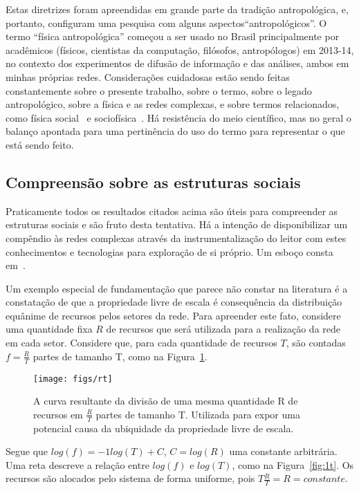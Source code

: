 \documentclass[a4paper,openright,12pt]{report} %
\begin{document}
Estas diretrizes foram apreendidas em grande parte da tradição antropológica,
e, portanto, configuram uma pesquisa com alguns aspectos``antropológicos''.
O termo ``física antropológica'' começou a ser usado no Brasil principalmente por
acadêmicos (físicos, cientistas da computação, filósofos, antropólogos) em 2013-14,
no contexto dos experimentos de difusão de informação e das análises, ambos em minhas próprias redes.
Considerações cuidadosas estão sendo feitas constantemente sobre o presente trabalho, 
sobre o termo, sobre o legado antropológico,
sobre a física e as redes complexas, e sobre termos relacionados, 
como física social~\cite{pentland} e sociofísica~\cite{socioF}.
Há resistência do meio científico, mas no geral o balanço apontada para uma pertinência do uso do termo
para representar o que está sendo feito.

\subsection{Compreensão sobre as estruturas sociais}\label{sec:com}
Praticamente todos os resultados citados acima
são úteis para compreender as estruturas sociais e são
fruto desta tentativa.
Há a intenção de disponibilizar um compêndio às redes complexas
através da instrumentalização do leitor com estes conhecimentos e tecnologias
para exploração de si próprio. Um esboço
consta em~\cite{gradus}.

Um exemplo especial de fundamentação que parece não 
constar na literatura é a constatação de que
a propriedade livre de escala é consequência da distribuição
equânime de recursos pelos setores da rede.
Para apreender este fato, considere uma quantidade fixa $R$ de recursos
que será utilizada para a realização da rede em cada setor.
Considere que, para cada quantidade de recursos $T$, são contadas $f=\frac{R}{T}$ partes de tamanho T, como na Figura~\ref{fig:1T}.

\begin{figure}[!h]
    \centering
    \texttt{[image: figs/rt]}
    \caption{A curva resultante da divisão de uma mesma quantidade
    R de recursos em $\frac{R}{T}$ partes de tamanho T.
        Utilizada para expor uma potencial causa da ubiquidade da
        propriedade livre de escala.}
    \label{fig:1T}
\end{figure}

Segue que $log(f)=-1 log(T) + C$, $C=log(R)$ uma constante
arbitrária. Uma reta descreve a relação entre $log(f)$ e 
$log(T)$, como na Figura~\ref{fig:1t}.
Os recursos são alocados pelo sistema de forma uniforme,
pois $T\frac{R}{T}=R=constante$.
\end{document}
